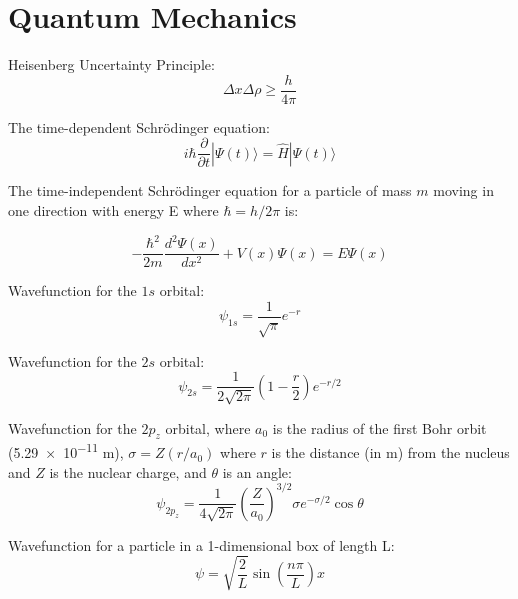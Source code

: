 \documentclass[10pt]{article}
\begin{document}
\newpage
\section{Quantum Mechanics}

Heisenberg Uncertainty Principle:
\begin{equation*}
\Delta x \Delta\rho \ge \frac{h}{4\pi}
\end{equation*}

The time-dependent Schr\"odinger equation:
\begin{equation*}
i\hbar\frac{\partial}{\partial t}|\Psi(t)\rangle = \hat{H}|\Psi(t)\rangle
\end{equation*}

The time-independent Schr\"odinger equation for a particle of mass $m$ moving in one direction with energy E where $\hbar=h/2\pi$ is:

\begin{equation*}
-\frac{\hbar^2}{2m}\frac{d^2\Psi(x)}{dx^2}+V(x)\Psi(x)=E\Psi(x)
\end{equation*}

Wavefunction for the $1s$ orbital:
\begin{equation*}
\psi_{1s} = \frac{1}{\sqrt{\pi}}e^{-r}
\end{equation*}

Wavefunction for the $2s$ orbital:
\begin{equation*}
\psi_{2s} = \frac{1}{2\sqrt{2\pi}}\left(1-\frac{r}{2}\right)e^{-r/2}
\end{equation*}

Wavefunction for the $2p_z$ orbital, where $a_0$ is the radius of the first Bohr orbit (\num{5.29e-11} m), $\sigma = Z(r/a_0)$ 
where $r$ is the distance (in m) from the nucleus and $Z$ is the nuclear charge, and $\theta$ is an angle:
\begin{equation*}
\psi_{2p_z} = \frac{1}{4\sqrt{2\pi}}\left(\frac{Z}{a_0}\right)^{3/2}\sigma e^{-\sigma/2}\cos\theta
\end{equation*}

Wavefunction for a particle in a 1-dimensional box of length L:
\begin{equation*}
\psi=\sqrt{\frac{2}{L}}\sin\left(\frac{n\pi}{L}\right)x
\end{equation*}
\end{document}
